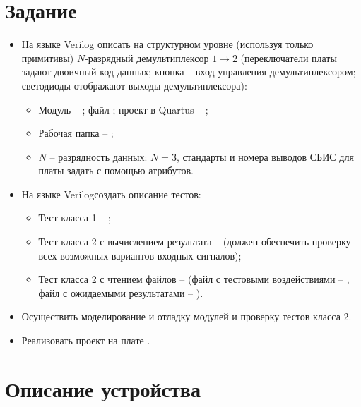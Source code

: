 





\tableofcontents
\lstlistoflistings
\listoffigures
\newpage

\section{Задание}

\begin{itemize}
	\item На языке Verilog описать на структурном уровне (используя только примитивы) $N$-разрядный демультиплексор $1 \rightarrow 2$ (переключатели платы  задают двоичный код данных; кнопка -- вход управления демультиплексором; светодиоды отображают выходы демультиплексора):
		\begin{itemize}
			\item Модуль -- ; файл ; проект в Quartus -- ;
			\item Рабочая папка -- ;
			\item $N$ -- разрядность данных: $N = 3$, стандарты и номера выводов СБИС для платы  задать с помощью атрибутов.
		\end{itemize}
	
	\item На языке Verilogсоздать описание тестов:
		\begin{itemize}
			\item Тест класса 1 -- ;
			\item Тест класса 2 с вычислением результата --  (должен обеспечить проверку всех возможных вариантов входных сигналов);
			\item Тест класса 2 с чтением файлов --  (файл с тестовыми воздействиями -- , файл с ожидаемыми результатами -- ).
		\end{itemize}
	
	\item Осуществить моделирование и отладку модулей и проверку тестов класса 2.
	
	\item Реализовать проект на плате .
\end{itemize}

\section{Описание устройства}

